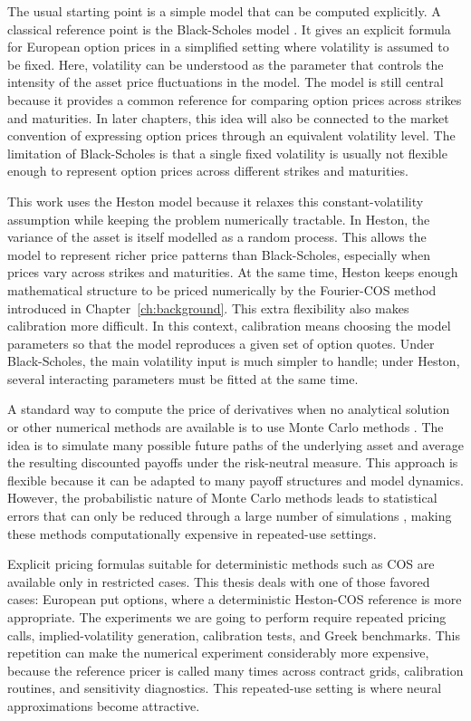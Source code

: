 The usual starting point is a simple model that can be computed explicitly. A classical reference point is the Black-Scholes model \cite{black_scholes_1973}. It gives an explicit formula for European option prices in a simplified setting where volatility is assumed to be fixed. 
Here, volatility can be understood as the parameter that controls the intensity of the asset price fluctuations in the model.
The model is still central because it provides a common reference for comparing option prices across strikes and maturities. In later chapters, this idea will also be connected to the market convention of expressing option prices through an equivalent volatility level.
The limitation of Black-Scholes is that a single fixed volatility is usually not flexible enough to represent option prices across different strikes and maturities.


This work uses the Heston model \cite{heston} because it relaxes this constant-volatility assumption while keeping the problem numerically tractable. In Heston, the variance of the asset is itself modelled as a random process.
This allows the model to represent richer price patterns than Black-Scholes, especially when prices vary across strikes and maturities. At the same time, Heston keeps enough mathematical structure to be priced numerically by the Fourier-COS method introduced in Chapter~\ref{ch:background}.
This extra flexibility also makes calibration more difficult. In this context, calibration means choosing the model parameters so that the model reproduces a given set of option quotes. Under Black-Scholes, the main volatility input is much simpler to handle; under Heston, several interacting parameters must be fitted at the same time.

A standard way to compute the price of derivatives when no analytical solution or other numerical methods are available is to use Monte Carlo methods \cite{boyle1977montecarlo}. 
The idea is to simulate many possible future paths of the underlying asset and average the resulting discounted payoffs under the risk-neutral measure.
This approach is flexible because it can be adapted to many payoff structures and model dynamics. 
However, the probabilistic nature of Monte Carlo methods leads to statistical errors that can only be reduced through a large number of simulations \cite{glasserman2004montecarlo}, making these methods computationally expensive in repeated-use settings.

Explicit pricing formulas suitable for deterministic methods such as COS are available only in restricted cases. 
This thesis deals with one of those favored cases: European put options, where a deterministic Heston-COS reference is more appropriate. 
The experiments we are going to perform require repeated pricing calls, implied-volatility generation, calibration tests, and Greek benchmarks.
This repetition can make the numerical experiment considerably more expensive, because the reference pricer is called many times across contract grids, calibration routines, and sensitivity diagnostics. 
This repeated-use setting is where neural approximations become attractive.

